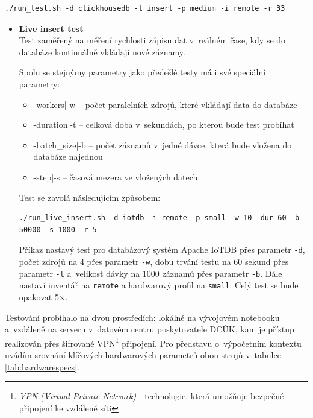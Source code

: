 \vspace{1.5em}
\begin{lstlisting}[caption={Příklad spuštění live insert testu}, label={lst:liveinsert}, captionpos=b]
    ./run_test.sh -d clickhousedb -t insert -p medium -i remote -r 33 
\end{lstlisting}
\begin{itemize}
     \item \textbf{Live insert test} \\
    Test zaměřený na měření rychlosti zápisu dat v~reálném čase, kdy se do databáze kontinuálně vkládají nové záznamy.
    
    Spolu se stejnýmy parametry jako předešlé testy má i své speciální parametry:
    \begin{itemize}
        \item -workers|-w -- počet paralelních zdrojů, které vkládají data do databáze
        \item -duration|-t -- celková doba v~sekundách, po kterou bude test probíhat
        \item -batch\_size|-b -- počet záznamů v~jedné dávce, která bude vložena do databáze 
        najednou
        \item -step|-s -- časová mezera ve vložených datech
    \end{itemize}
    \clearpage
    Test se zavolá následujícím způsobem:
    \begin{lstlisting}[caption={Příklad spuštění live insert testu}, label={lst:liveinsert}, captionpos=b]
    ./run_live_insert.sh -d iotdb -i remote -p small -w 10 -dur 60 -b 50000 -s 1000 -r 5
    \end{lstlisting}
    Příkaz nastavý test pro databázový systém Apache IoTDB přes parametr \texttt{-d}, počet zdrojů na 4 přes parametr \texttt{-w}, dobu trvání testu na 60 sekund přes parametr \texttt{-t} a~velikost dávky na 1000 záznamů přes parametr \texttt{-b}. Dále nastaví inventář na \texttt{remote} a hardwarový profil na \texttt{small}. Celý test se bude opakovat 5$\times$.
\end{itemize}

Testování probíhalo na dvou prostředích: lokálně na vývojovém notebooku a~vzdáleně na serveru v~datovém centru poskytovatele DCÚK, kam je přístup realizován přes šifrované VPN\footnote{\textit{VPN (Virtual Private Network)} - technologie, která umožňuje bezpečné připojení ke vzdálené síti} připojení. Pro představu o~výpočetním kontextu uvádím srovnání klíčových hardwarových parametrů obou strojů v~tabulce \ref{tab:hardwarespecs}.

